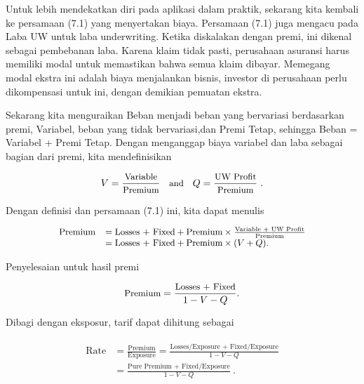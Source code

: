 \documentclass[
]{book}
\begin{document}
Untuk lebih mendekatkan diri pada aplikasi dalam praktik, sekarang kita kembali ke persamaan (7.1) yang menyertakan biaya. Persamaan (7.1) juga mengacu pada Laba UW untuk laba underwriting. Ketika diskalakan dengan premi, ini dikenal sebagai pembebanan laba. Karena klaim tidak pasti, perusahaan asuransi harus memiliki modal untuk memastikan bahwa semua klaim dibayar. Memegang modal ekstra ini adalah biaya menjalankan bisnis, investor di perusahaan perlu dikompensasi untuk ini, dengan demikian pemuatan ekstra.

Sekarang kita menguraikan Beban menjadi beban yang bervariasi berdasarkan premi, Variabel, beban yang tidak bervariasi,dan Premi Tetap, sehingga Beban = Variabel + Premi Tetap. Dengan menganggap biaya variabel dan laba sebagai bagian dari premi, kita mendefinisikan

\begin{equation}
\small{
V =  \frac{\text{Variable}}{\text{Premium}} ~~~ \text{and}~~~
Q = \frac{\text{UW Profit}}{\text{Premium}} ~.
}
\end{equation}

Dengan definisi dan persamaan (7.1) ini, kita dapat menulis

\begin{equation}
\small{
\begin{matrix}
\begin{array}{ll}
\text{Premium} &= \text{Losses + Fixed} + \text{Premium} \times \frac{\text{Variable + UW Profit}}{\text{Premium}}  \\
& = \text{Losses + Fixed} + \text{Premium} \times (V+Q) .
\end{array}
\end{matrix}
}
\end{equation}

Penyelesaian untuk hasil premi

\begin{equation}
\small{
\text{Premium} = \frac{\text{Losses + Fixed}}{1-V-Q} .
}
\end{equation}

Dibagi dengan eksposur, tarif dapat dihitung sebagai

\begin{equation}
\begin{matrix}
\begin{array}{ll}
\text{Rate} &= \frac{\text{Premium}}{\text{Exposure}} = \frac{\text{Losses/Exposure + Fixed/Exposure}}{1-V-Q} \\
&=   \frac{\text{Pure Premium + Fixed/Exposure}}{1-V-Q} ~.
\end{array}
\end{matrix}
\end{equation}
\end{document}
